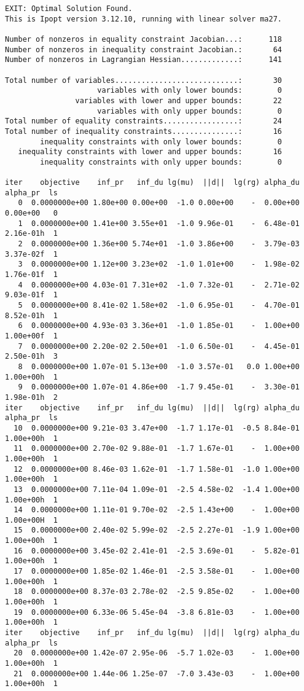 \begin{lstlisting}
EXIT: Optimal Solution Found.
This is Ipopt version 3.12.10, running with linear solver ma27.

Number of nonzeros in equality constraint Jacobian...:      118
Number of nonzeros in inequality constraint Jacobian.:       64
Number of nonzeros in Lagrangian Hessian.............:      141

Total number of variables............................:       30
                     variables with only lower bounds:        0
                variables with lower and upper bounds:       22
                     variables with only upper bounds:        0
Total number of equality constraints.................:       24
Total number of inequality constraints...............:       16
        inequality constraints with only lower bounds:        0
   inequality constraints with lower and upper bounds:       16
        inequality constraints with only upper bounds:        0

iter    objective    inf_pr   inf_du lg(mu)  ||d||  lg(rg) alpha_du alpha_pr  ls
   0  0.0000000e+00 1.80e+00 0.00e+00  -1.0 0.00e+00    -  0.00e+00 0.00e+00   0
   1  0.0000000e+00 1.41e+00 3.55e+01  -1.0 9.96e-01    -  6.48e-01 2.16e-01h  1
   2  0.0000000e+00 1.36e+00 5.74e+01  -1.0 3.86e+00    -  3.79e-03 3.37e-02f  1
   3  0.0000000e+00 1.12e+00 3.23e+02  -1.0 1.01e+00    -  1.98e-02 1.76e-01f  1
   4  0.0000000e+00 4.03e-01 7.31e+02  -1.0 7.32e-01    -  2.71e-02 9.03e-01f  1
   5  0.0000000e+00 8.41e-02 1.58e+02  -1.0 6.95e-01    -  4.70e-01 8.52e-01h  1
   6  0.0000000e+00 4.93e-03 3.36e+01  -1.0 1.85e-01    -  1.00e+00 1.00e+00f  1
   7  0.0000000e+00 2.20e-02 2.50e+01  -1.0 6.50e-01    -  4.45e-01 2.50e-01h  3
   8  0.0000000e+00 1.07e-01 5.13e+00  -1.0 3.57e-01   0.0 1.00e+00 1.00e+00h  1
   9  0.0000000e+00 1.07e-01 4.86e+00  -1.7 9.45e-01    -  3.30e-01 1.98e-01h  2
iter    objective    inf_pr   inf_du lg(mu)  ||d||  lg(rg) alpha_du alpha_pr  ls
  10  0.0000000e+00 9.21e-03 3.47e+00  -1.7 1.17e-01  -0.5 8.84e-01 1.00e+00h  1
  11  0.0000000e+00 2.70e-02 9.88e-01  -1.7 1.67e-01    -  1.00e+00 1.00e+00h  1
  12  0.0000000e+00 8.46e-03 1.62e-01  -1.7 1.58e-01  -1.0 1.00e+00 1.00e+00h  1
  13  0.0000000e+00 7.11e-04 1.09e-01  -2.5 4.58e-02  -1.4 1.00e+00 1.00e+00h  1
  14  0.0000000e+00 1.11e-01 9.70e-02  -2.5 1.43e+00    -  1.00e+00 1.00e+00H  1
  15  0.0000000e+00 2.40e-02 5.99e-02  -2.5 2.27e-01  -1.9 1.00e+00 1.00e+00h  1
  16  0.0000000e+00 3.45e-02 2.41e-01  -2.5 3.69e-01    -  5.82e-01 1.00e+00h  1
  17  0.0000000e+00 1.85e-02 1.46e-01  -2.5 3.58e-01    -  1.00e+00 1.00e+00h  1
  18  0.0000000e+00 8.37e-03 2.78e-02  -2.5 9.85e-02    -  1.00e+00 1.00e+00h  1
  19  0.0000000e+00 6.33e-06 5.45e-04  -3.8 6.81e-03    -  1.00e+00 1.00e+00h  1
iter    objective    inf_pr   inf_du lg(mu)  ||d||  lg(rg) alpha_du alpha_pr  ls
  20  0.0000000e+00 1.42e-07 2.95e-06  -5.7 1.02e-03    -  1.00e+00 1.00e+00h  1
  21  0.0000000e+00 1.44e-06 1.25e-07  -7.0 3.43e-03    -  1.00e+00 1.00e+00h  1


\end{lstlisting}
